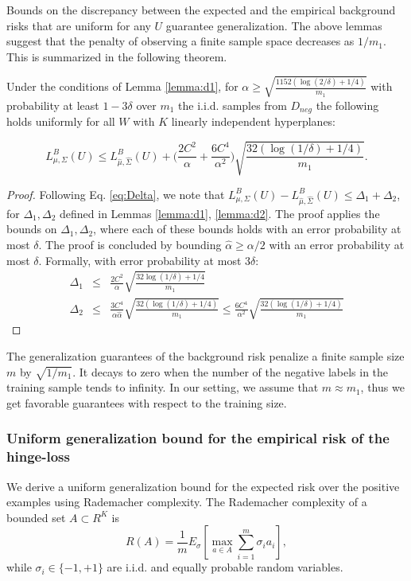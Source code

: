 \documentclass[twoside,11pt]{article}
\begin{document}
Bounds on the discrepancy between the expected and the empirical background risks that are uniform for any $U$ guarantee generalization. The above lemmas suggest that the penalty of observing a finite sample space decreases as $1/ m_1$. This is summarized in the following theorem.


\begin{theorem}
\label{theorem:minimax1}

Under the conditions of Lemma \ref{lemma:d1}, for $\alpha \ge \sqrt{\frac{1152 (\log(2/\delta) + 1/4)}{m_1}}$ with probability at least $1-3\delta$ over $m_1$ the i.i.d. samples from $D_{neg}$ the following holds uniformly for all $W$ with  $K$ linearly independent hyperplanes:

 $$L_{\mu,\Sigma}^{B}(U) \le L_{\hat \mu,\hat \Sigma}^{B}(U) + \Big(\frac{2C^2}{\alpha} + \frac{6C^4}{\alpha^2} \Big) \sqrt{\frac{32(\log(1/\delta) + 1/4)}{m_1}}.$$
 \end{theorem}
 \begin{proof}
 Following Eq. \ref{eq:Delta}, we note that $L_{\mu,\Sigma}^{B}(U) - L_{\hat \mu,\hat \Sigma}^{B}(U) \le \Delta_1 + \Delta_2$, for $\Delta_1, \Delta_2$ defined in Lemmas \ref{lemma:d1}, \ref{lemma:d2}.  The proof applies the bounds on $\Delta_1, \Delta_2$, where each of these bounds holds with an error probability at most $\delta$. The proof is concluded by bounding $\hat \alpha \ge \alpha/2$ with an error probability at most $\delta$.  Formally, with error probability at most $3\delta$:
 \begin{eqnarray*}
 \Delta_1 &\le& \frac{2C^2}{\alpha}\sqrt{\frac{32 \log (1/\delta) + 1/4}{m_1}}\\
 \Delta_2 &\le& \frac{3C^4}{\alpha \hat \alpha} \sqrt{\frac{32(\log (1/\delta) + 1/4)}{m_1}} \le \frac{6C^4}{\alpha^2} \sqrt{\frac{32(\log (1/\delta) + 1/4)}{m_1}}
 \end{eqnarray*}



\end{proof}
The generalization guarantees of the background risk penalize a finite sample size $m$ by $\sqrt{1/m_1}$. It decays to zero when the number of the negative labels in the training sample tends to infinity. In our setting, we assume that $m \approx m_1$, thus we get favorable guarantees with respect to the training size.

\subsubsection{Uniform generalization bound for the empirical risk of the hinge-loss}
We derive a uniform generalization bound for the expected risk over the positive examples using  Rademacher complexity. The Rademacher complexity of a bounded set $A \subset R^K$ is $$R(A) = \frac{1}{m}E_\sigma \left[ \max_{a \in A} \sum_{i=1}^m \sigma_i a_i \right],$$ while $\sigma_i \in \{-1,+1\}$ are i.i.d. and equally probable random variables.
\end{document}
